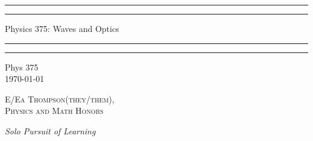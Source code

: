 \documentclass[12pt, a4paper, oneside, openright, titlepage]{book}
\begin{document}

\begin{titlepage}
    \centering
    \scshape
    \vspace*{\baselineskip}
    \rule{\textwidth}{1.6pt}\vspace*{-\baselineskip}\vspace*{2pt}
    \rule{\textwidth}{0.4pt}
    
    \vspace{0.75\baselineskip}
    
    {\LARGE Physics 375: Waves and Optics}
    
    \vspace{0.75\baselineskip}
    
    \rule{\textwidth}{0.4pt}\vspace*{-\baselineskip}\vspace{3.2pt}
    \rule{\textwidth}{1.6pt}
    
    \vspace{2\baselineskip}
    Phys 375 \\
    \vspace*{3\baselineskip}
    \monthdayyeardate\today \\
    \vspace*{5.0\baselineskip}
    
    {\scshape\Large E/Ea Thompson(they/them), \\ Physics and Math Honors\\}
    
    \vspace{1.0\baselineskip}
    \textit{Solo Pursuit of Learning}
    \vfill
    \enlargethispage{1in}
    \begin{figure}[b!]
    \end{figure}
\end{titlepage}
\end{document}
